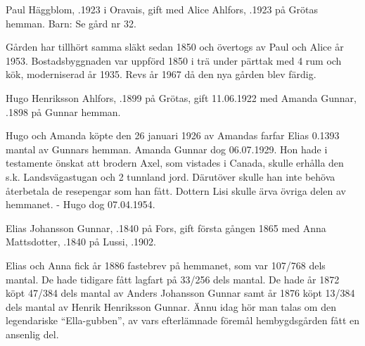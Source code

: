

Paul Häggblom, .1923 i Oravais, gift med Alice Ahlfors, .1923 på Grötas hemman. Barn: Se gård nr 32.

Gården har tillhört samma släkt sedan 1850 och övertogs av Paul och Alice år 1953. Bostadsbyggnaden var uppförd 1850 i trä under pärttak med 4 rum och kök, moderniserad år 1935. Revs år 1967 då den nya gården blev färdig.


Hugo Henriksson Ahlfors, .1899 på Grötas, gift 11.06.1922 med Amanda Gunnar, .1898 på Gunnar hemman.
\begin{jhchildren}
  \item {}
  \item {}
\end{jhchildren}

Hugo och Amanda köpte den 26 januari 1926 av Amandas farfar Elias 0.1393 mantal av Gunnars hemman. Amanda Gunnar dog 06.07.1929. Hon hade i testamente önskat att brodern Axel, som vistades i Canada, skulle erhålla den s.k. Landsvägastugan och 2 tunnland jord. Därutöver skulle han inte behöva återbetala de resepengar som han fått. Dottern Lisi skulle ärva övriga delen av hemmanet. - Hugo dog 07.04.1954.



Elias Johansson Gunnar, .1840 på Fors, gift första gången 1865 med Anna Mattsdotter, .1840 på Lussi, .1902.
\begin{jhchildren}
  \item {}
  \item {}
  \item {}
\end{jhchildren}

Elias och Anna fick år 1886 fastebrev på hemmanet, som var 107/768 dels mantal. De hade tidigare fått lagfart på 33/256 dels mantal. De hade år 1872 köpt 47/384 dels mantal av Anders Johansson Gunnar samt år 1876 köpt 13/384 dels mantal av Henrik Henriksson Gunnar. Ännu idag hör man talas om den legendariske ``Ella-gubben'', av vars efterlämnade föremål hembygdsgården fått en ansenlig del.

